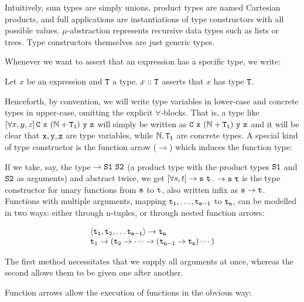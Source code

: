 Intuitively, sum types are simply unions, product types are named Cartesian products, and full applications are instantiations of type constructors with all possible values. $\mu$-abstraction represents recursive data types such as lists or trees. Type constructors themselves are just generic types.

Whenever we want to assert that an expression has a specific type, we write:

\begin{notation}
	Let $x$ be an expression and $\mathtt{T}$ a type. $x :: \mathtt{T}$ asserts that $x$ has type $\mathtt{T}$.
\end{notation}

Henceforth, by convention, we will write type variables in lower-case and concrete types in upper-case, omitting the explicit $\forall$-blocks. That is, a type like $\allQ{x,y,z} \type{C\ x\ (\N + T_1)\ y\ z}$ will simply be written as $\mathtt{C\ x\ (\mathbb{N} + T_1)\ y\ z}$ and it will be clear that $\mathtt{x}, \mathtt{y}, \mathtt{z}$ are type variables, while $\mathbb{N}, \mathtt{T_1}$ are concrete types. A special kind of type constructor is the function arrow ($\rightarrow$) which induces the function type:

\begin{example}
	If we take, say, the type $\rightarrow \mathtt{S1}\ \mathtt{S2}$ (a product type with the product types $\mathtt{S1}$ and $\mathtt{S2}$ as arguments) and abstract twice, we get $\allQ{s,t} \rightarrow \type{s}\ \type{t}$. $\rightarrow \type{s}\ \type{t}$ is the type constructor for unary functions from $\mathtt{s}$ to $\mathtt{t}$, also written infix as $\mathtt{s} \rightarrow \mathtt{t}$. Functions with multiple arguments, mapping $\mathtt{t_1},\dots,\mathtt{t_{n-1}}$ to $\mathtt{t_n}$, can be modelled in two ways: either through n-tuples, or through nested function arrows:
	
	$$
	\begin{array}{l}
	\langle \mathtt{t_1}, \mathtt{t_2}, \dots \mathtt{t_{n-1}} \rangle \rightarrow \mathtt{t_n}\\
	\mathtt{t_1} \rightarrow (\mathtt{t_2} \rightarrow \dots \rightarrow (\mathtt{t_{n-1}} \rightarrow \mathtt{t_n})\cdots)
	\end{array}
	$$
	
	The first method necessitates that we supply all arguments at once, whereas the second allows them to be given one after another.
\end{example}

\noindent
Function arrows allow the execution of functions in the obvious way:

